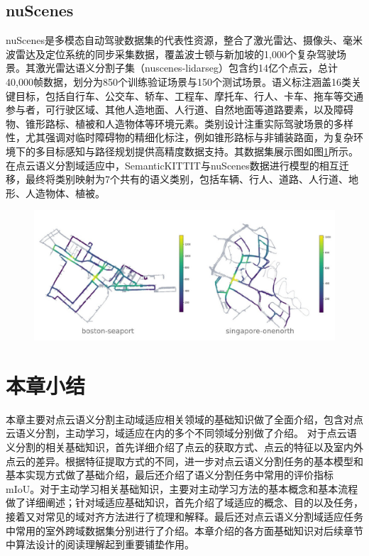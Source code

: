 \subsection{nuScenes}
nuScenes是多模态自动驾驶数据集的代表性资源，整合了激光雷达、摄像头、毫米波雷达及定位系统的同步采集数据，覆盖波士顿与新加坡的1,000个复杂驾驶场景。其激光雷达语义分割子集（nuscenes-lidarseg）包含约14亿个点云，总计40,000帧数据，划分为850个训练验证场景与150个测试场景。语义标注涵盖16类关键目标，包括自行车、公交车、轿车、工程车、摩托车、行人、卡车、拖车等交通参与者，可行驶区域、其他人造地面、人行道、自然地面等道路要素，以及障碍物、锥形路标、植被和人造物体等环境元素。类别设计注重实际驾驶场景的多样性，尤其强调对临时障碍物的精细化标注，例如锥形路标与非铺装路面，为复杂环境下的多目标感知与路径规划提供高精度数据支持。其数据集展示图如图\ref{fig:2-7}所示。
在点云语义分割域适应中，SemanticKITTIT与nuScenes数据进行模型的相互迁移，最终将类别映射为7个共有的语义类别，包括车辆、行人、道路、人行道、地形、人造物体、植被。
\vspace{-0.1cm}
\begin{figure}[h]
    \centering
    \includegraphics[width = \textwidth, scale=0.5]{ljx/figure/2-5/nuScenes.pdf}
    \label{fig:2-7}
\end{figure}
\vspace{-0.35cm} 
\section{本章小结}
本章主要对点云语义分割主动域适应相关领域的基础知识做了全面介绍，包含对点云语义分割，主动学习，域适应在内的多个不同领域分别做了介绍。 对于点云语义分割的相关基础知识，首先详细介绍了点云的获取方式、点云的特征以及室内外点云的差异。根据特征提取方式的不同，进一步对点云语义分割任务的基本模型和基本实现方式做了基础介绍，最后还介绍了语义分割任务中常用的评价指标mIoU。对于主动学习相关基础知识，主要对主动学习方法的基本概念和基本流程做了详细阐述；针对域适应基础知识，首先介绍了域适应的概念、目的以及任务，接着又对常见的域对齐方法进行了梳理和解释。最后还对点云语义分割域适应任务中常用的室外跨域数据集分别进行了介绍。本章介绍的各方面基础知识对后续章节中算法设计的阅读理解起到重要铺垫作用。
